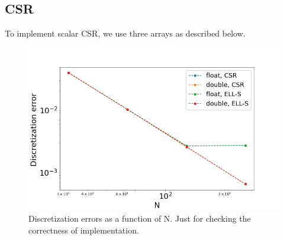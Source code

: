 \documentclass{article}
\begin{document}
\subsection{CSR}
To implement scalar CSR, we use three arrays as described below.  
 \begin{figure}[h]
	\centering
	\includegraphics[scale=0.36]{errors.png}  
	\caption{ Discretization errors as a function of N. Just  for checking the correctness of implementation.  }
	\label{erros}
\end{figure}
 
\end{document}

